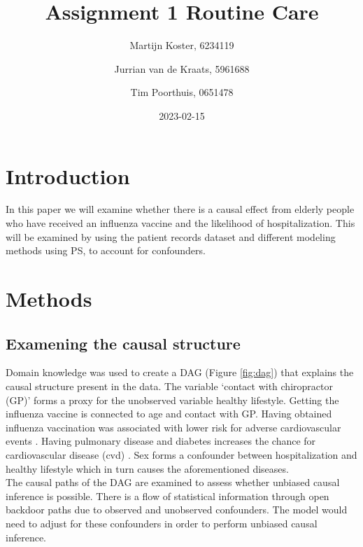 \documentclass[
]{article}
\title{Assignment 1 Routine Care}
\author{Martijn Koster, 6234119 \and Jurrian van de Kraats, 5961688 \and Tim Poorthuis, 0651478}
\date{2023-02-15}
\begin{document}
\maketitle

\newpage

\hypertarget{introduction}{%
\section{Introduction}\label{introduction}}

In this paper we will examine whether there is a causal effect from elderly people who have received an influenza vaccine and the likelihood of hospitalization. This will be examined by using the patient records dataset and different modeling methods using PS, to account for confounders.

\hypertarget{methods}{%
\section{Methods}\label{methods}}

\hypertarget{examening-the-causal-structure}{%
\subsection{Examening the causal structure}\label{examening-the-causal-structure}}

Domain knowledge was used to create a DAG (Figure \ref{fig:dag}) that explains the causal structure present in the data. The variable `contact with chiropractor (GP)' forms a proxy for the unobserved variable healthy lifestyle. Getting the influenza vaccine is connected to age and contact with GP. Having obtained influenza vaccination was associated with lower risk for adverse cardiovascular events \citep{behrouzi}. Having pulmonary disease and diabetes increases the chance for cardiovascular disease (cvd) \citep{nhg}. Sex forms a confounder between hospitalization and healthy lifestyle \citep{loef} which in turn causes the aforementioned diseases.\\
\hspace*{0.333em}\hspace*{0.333em}The causal paths of the DAG are examined to assess whether unbiased causal inference is possible. There is a flow of statistical information through open backdoor paths due to observed and unobserved confounders. The model would need to adjust for these confounders in order to perform unbiased causal inference.
\end{document}

